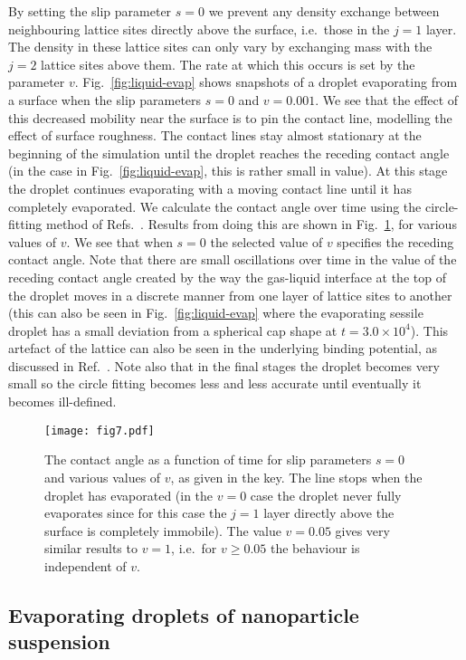 \documentclass[journal=langd5,manuscript=article]{achemso}
\begin{document}
By setting the slip parameter $s=0$ we prevent any density exchange
between neighbouring lattice sites directly above the surface, i.e.\ those in the $j=1$ layer. The density in these lattice sites can only vary by exchanging mass with the $j=2$ lattice sites above them. The rate at which this occurs is set by the parameter $v$. Fig.~\ref{fig:liquid-evap} shows snapshots of a droplet evaporating from a surface when the slip parameters $s=0$ and $v=0.001$. We see that the effect of this decreased mobility near the surface is to
pin the contact line, modelling the effect of surface roughness. The
contact lines stay almost stationary at the beginning of the
simulation until the droplet reaches the receding contact angle (in the case in Fig.~\ref{fig:liquid-evap}, this is rather small in value). At this stage the droplet continues evaporating with a moving contact line until it
has completely evaporated. We calculate the contact angle
over time using the circle-fitting method of Refs.\ . Results from doing this are
shown in Fig.~\ref{fig:receding-angles}, for various values of $v$. We see that when $s=0$ the selected value of $v$
specifies the receding contact angle. Note that there are small oscillations over time in the value of the receding contact angle created by the {way the gas-liquid interface at the} top of the droplet {moves in a discrete manner} from one layer of lattice sites to another {(this can also be seen in Fig.~\ref{fig:liquid-evap} where the evaporating sessile droplet has a small deviation from a spherical cap shape at $t=3.0\times10^4$)}. This artefact of the lattice can also be seen in the underlying binding potential, as discussed in Ref.\ . Note also that in the final stages the droplet becomes very small so the circle fitting becomes less and less accurate until eventually it becomes ill-defined.

\begin{figure}
\texttt{[image: fig7.pdf]}
\caption{%
  The contact angle as a function of time for slip parameters $s=0$ and
  various values of $v$, as given in the key. The line stops when the
  droplet has evaporated (in the $v=0$ case the droplet never fully evaporates  since for this case the $j=1$ layer directly above the surface is completely immobile). The value $v=0.05$ gives very similar results to $v=1$, i.e.\
  for $v \geq 0.05$ the behaviour is independent of $v$.
}
\label{fig:receding-angles}
\end{figure}

\subsection{Evaporating droplets of nanoparticle suspension}
\end{document}

